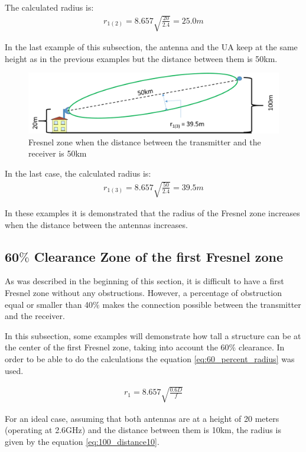 The calculated radius is:
\begin{align*}
r_{1(2)} = 8.657 \sqrt{\frac{20}{2.4}} = 25.0m
\end{align*}

In the last example of this subsection, the antenna and the UA keep at the same height as in the previous examples but the distance between them is 50km.

\begin{figure}[H]
	\centering
	\includegraphics[scale=0.50]{figures/fresnel_50km.png}
	\caption{Fresnel zone when the distance between the transmitter and the receiver is 50km}
	\label{fig:fresnel_zones_50km}
\end{figure}  

In the last case, the calculated radius is:
\begin{align*}
r_{1(3)} = 8.657\sqrt{\frac{50}{2.4}} = 39.5m
\end{align*}

In these examples it is demonstrated that the radius of the Fresnel zone increases when the distance between the antennas increases.

\subsection{60$\%$ Clearance Zone of the first Fresnel zone}
As was described in the beginning of this section, it is difficult to have a first Fresnel zone without any obstructions. However, a percentage of obstruction equal or smaller than 40$\%$ makes the connection possible between the transmitter and the receiver.

In this subsection, some examples will demonstrate how tall a structure can be at the center of the first Fresnel zone, taking into account the 60$\%$ clearance. In order to be able to do the calculations the equation \ref{eq:60_percent_radius} was used.

\begin{align}
r_1 = 8.657\sqrt{\frac{0.6D}{f}}\label{eq:60_percent_radius}
\end{align}

For an ideal case, assuming that both antennas are at a height of 20 meters (operating at 2.6GHz) and the distance between them is 10km, the radius is given by the equation \ref{eq:100_distance10}.

